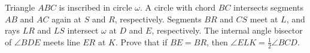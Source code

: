 Triangle $ABC$ is inscribed in circle $\omega$.  A circle with chord $BC$ intersects segments $AB$ and $AC$ again at $S$ and $R$, respectively.  Segments $BR$ and $CS$ meet at $L$, and rays $LR$ and $LS$ intersect $\omega$ at $D$ and $E$, respectively.  The internal angle bisector of $\angle BDE$ meets line $ER$ at $K$.  Prove that if $BE = BR$, then $\angle ELK = \tfrac{1}{2} \angle BCD$.

